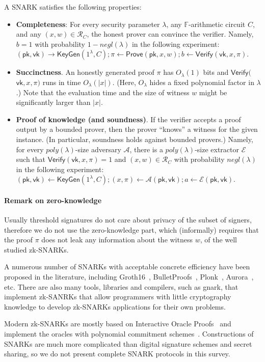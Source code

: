 A SNARK satisfies the following properties: 
\begin{itemize}
    \item \textbf{Completeness}: For every security parameter $\lambda$, any $\mathbb{F}$-arithmetic circuit $C$, and any $(x,w)\in\mathcal{R}_C$, the honest prover can convince the verifier. Namely, $b = 1$ with probability $1-negl(\lambda)$ in the following experiment: $(\mathsf{pk}, \mathsf{vk}) \to \mathsf{KeyGen}(1^{\lambda}, C); \pi \leftarrow \mathsf{Prove}(\mathsf{pk}, x, w); b \leftarrow \mathsf{Verify}(\mathsf{vk}, x, \pi)$.
    \item \textbf{Succinctness}. An honestly generated proof $\pi$ has $O_\lambda(1)$ bits and $\mathsf{Verify}($ $\mathsf{vk},x,\pi)$ runs in time $O_\lambda(|x|)$. (Here, $O_\lambda$ hides a fixed polynomial factor in $\lambda$.) Note that the evaluation time and the size of witness $w$ might be significantly larger than $|x|$. 
    \item \textbf{Proof of knowledge (and soundness)}. If the verifier accepts a proof output by a bounded prover, then the prover “knows” a witness for the given instance. (In particular, soundness holds against bounded provers.) Namely, for every $poly(\lambda)$-size adversary $\mathcal{A}$, there is a $poly(\lambda)$-size extractor $\mathcal{E}$ such that $\mathsf{Verify}(\mathsf{vk}, x, \pi) = 1$ and $(x, w) \in \mathcal{R}_C$ with probability $negl(\lambda)$ in the following experiment: $(\mathsf{pk}, \mathsf{vk}) \leftarrow \mathsf{KeyGen}(1^\lambda, C); (x, \pi) \leftarrow \mathcal{A}(\mathsf{pk}, \mathsf{vk}); a \leftarrow \mathcal{E}(\mathsf{pk}, \mathsf{vk})$.
\end{itemize}

\paragraph{Remark on zero-knowledge} Usually threshold signatures do not care about privacy of the subset of signers, therefore we do not use the zero-knowledge part, which (informally) requires that the proof $\pi$ does not leak any information about the witness $w$, of the well studied zk-SNARKs. 

A numerous number of SNARKs with acceptable concrete efficiency have been proposed in the literature, including Groth16~\cite{DBLP:conf/eurocrypt/Groth16}, BulletProofs~\cite{DBLP:conf/sp/BunzBBPWM18}, Plonk~\cite{DBLP:journals/iacr/GabizonWC19}, Aurora~\cite{DBLP:conf/eurocrypt/Ben-SassonCRSVW19}, etc. There are also many tools, libraries and compilers, such as gnark, that implement zk-SANRKs that allow programmers with little cryptography knowledge to develop zk-SNARKs applications for their own problems. 

Modern zk-SNARKs are mostly based on Interactive Oracle Proofs~\cite{DBLP:conf/tcc/Ben-SassonCS16} and implement the oracles with polynomial commitment schemes~\cite{DBLP:conf/asiacrypt/KateZG10}.  Constructions of SNARKs are much more complicated than digital signature schemes and secret sharing, so we do not present complete SNARK protocols in this survey. 
